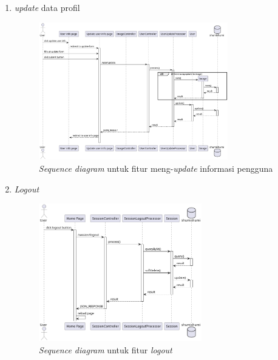 \documentclass[a4paper]{article}
\begin{document}
\begin{enumerate}
\begin{enumerate}
        \item \textit{update} data profil\\
        \begin{figure}[h]
            \centering
            \includegraphics*[height=6cm]{diagram/sequence diagram/5. update user info/update user info.png}
            \caption{\textit{Sequence diagram} untuk fitur meng-\textit{update} informasi pengguna}
        \end{figure}
        \item \textit{Logout}\\
        \begin{figure}[h]
            \centering
            \includegraphics*[height=6cm]{diagram/sequence diagram/6. logout/logout.png}
            \caption{\textit{Sequence diagram} untuk fitur \textit{logout}}
        \end{figure}
        \newpage


\end{enumerate}
\end{enumerate}
\end{document}
